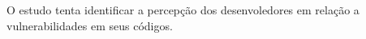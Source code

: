 








O estudo tenta identificar a percepção dos desenvoledores em relação a vulnerabilidades em seus códigos. 


